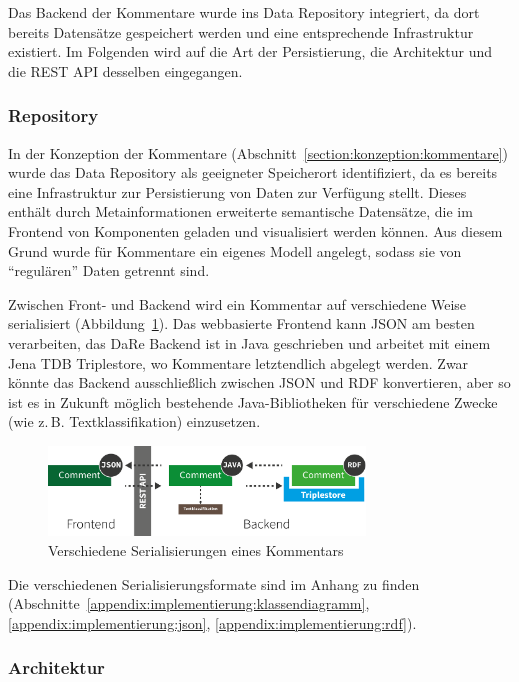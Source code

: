 \documentclass[
	headsepline,
	footsepline,
	fontsize=12pt,
	bibliography=totoc
]{scrbook}
\begin{document}
Das Backend der Kommentare wurde ins Data Repository integriert, da dort bereits Datensätze gespeichert werden und eine entsprechende Infrastruktur existiert. Im Folgenden wird auf die Art der Persistierung, die Architektur und die REST API desselben eingegangen.

\subsubsection{Repository}

In der Konzeption der Kommentare (Abschnitt~\ref{section:konzeption:kommentare}) wurde das Data Repository als geeigneter Speicherort identifiziert, da es bereits eine Infrastruktur zur Persistierung von Daten zur Verfügung stellt. Dieses enthält durch Metainformationen erweiterte semantische Datensätze, die im Frontend von Komponenten geladen und visualisiert werden können. Aus diesem Grund wurde für Kommentare ein eigenes Modell angelegt, sodass sie von \enquote{regulären} Daten getrennt sind.

Zwischen Front- und Backend wird ein Kommentar auf verschiedene Weise serialisiert (Abbildung~\ref{figure:kommentare-backend}). Das webbasierte Frontend kann JSON am besten verarbeiten, das DaRe Backend ist in Java geschrieben und arbeitet mit einem Jena TDB Triplestore, wo Kommentare letztendlich abgelegt werden. Zwar könnte das Backend ausschließlich zwischen JSON und RDF konvertieren, aber so ist es in Zukunft möglich bestehende Java-Bibliotheken für verschiedene Zwecke (wie z.\,B. Textklassifikation) einzusetzen.

\begin{figure}[htbp]
   \centering
   \includegraphics[width=0.75\textwidth]{images/implementierung-kommentare-backend.png}
   \caption{Verschiedene Serialisierungen eines Kommentars}
   \label{figure:kommentare-backend}
\end{figure}

Die verschiedenen Serialisierungsformate sind im Anhang zu finden (Abschnitte~\ref{appendix:implementierung:klassendiagramm}, \ref{appendix:implementierung:json}, \ref{appendix:implementierung:rdf}).

\subsubsection{Architektur}
\end{document}
